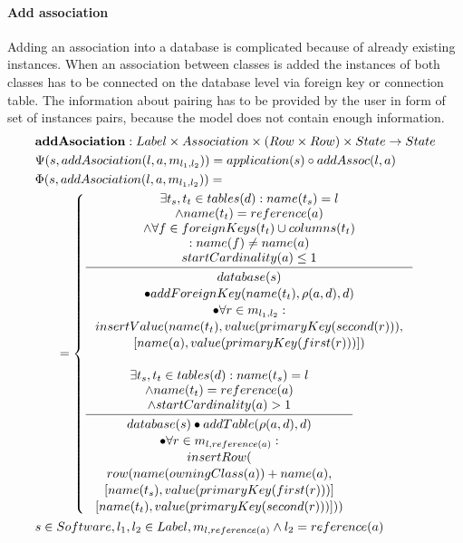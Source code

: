 \documentclass[11pt]{article}
\begin{document}
\paragraph{Add association} Adding an association into a database is complicated because of already existing instances. When an association between classes is added the instances of both classes has to be connected on the database level via foreign key or connection table. The information about pairing has to be provided by the user in form of set of instances pairs, because the model does not contain enough information. 
\begin{align*}
& \mathbf{addAsociation} : Label \times Association \times (Row \times Row) \times State \rightarrow State \\
& \Psi(s, addAsociation(l, a, m_{l_1, l_2})) = application(s) \circ addAssoc(l, a) \\
& \Phi(s, addAsociation(l, a, m_{l_1, l_2})) = \\
& \;\;\;\;\;\; = \begin{cases}
	\inference{ \exists t_s, t_t \in tables(d) : name(t_s) = l\\ 		\wedge name(t_t) = reference(a) \\ \wedge \forall f \in foreignKeys(t_t) \cup columns(t_t) \\: name(f) \neq name(a) \\ startCardinality(a) \leq 1}{\begin{gathered}
		database(s) \\ \bullet addForeignKey(name(t_t), \rho(a,d), d) \\ \bullet \forall r \in m_{l_1, l_2} : \\
		insertValue(name(t_t), value(primaryKey(second(r))), \\ [name(a), value(primaryKey(first(r)))])
	\end{gathered}}
 \\ \\
	\inference{ \exists t_s, t_t \in tables(d) : name(t_s) = l \\ \wedge name(t_t) = reference(a) \\ \wedge startCardinality(a) > 1}{\begin{gathered} 
	database(s) \bullet addTable(\rho(a,d),d) \\ \bullet \forall r \in m_{l, reference(a)} :
	\\ insertRow(\\ row(name(owningClass(a)) + name(a), \\ [name(t_s), value(primaryKey(first(r)))]\\ [name(t_t), value(primaryKey(second(r)))]))
	\end{gathered}} 
\end{cases}\\
& s \in Software, l_1, l_2 \in Label, m_{l, reference(a)} \wedge l_2 = reference(a)
\end{align*} 
\end{document}
